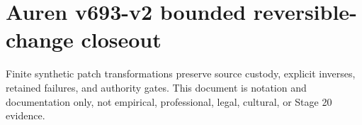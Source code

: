 \documentclass{article}
\begin{document}
\section*{Auren v693-v2 bounded reversible-change closeout}
Finite synthetic patch transformations preserve source custody, explicit inverses, retained failures, and authority gates. This document is notation and documentation only, not empirical, professional, legal, cultural, or Stage 20 evidence.
\end{document}

